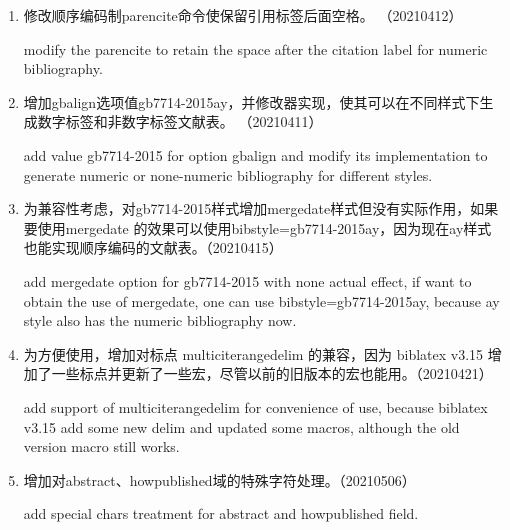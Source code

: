 \label{up:20210506}

\begin{enumerate}
\item 修改顺序编码制parencite命令使保留引用标签后面空格。 （20210412）

modify the parencite to retain the space after the citation label for numeric bibliography.


\item 增加gbalign选项值gb7714-2015ay，并修改器实现，使其可以在不同样式下生成数字标签和非数字标签文献表。 （20210411）

add value gb7714-2015 for option gbalign and modify its implementation to generate numeric or none-numeric bibliography for different styles.

\item 为兼容性考虑，对gb7714-2015样式增加mergedate样式但没有实际作用，如果要使用mergedate 的效果可以使用bibstyle=gb7714-2015ay，因为现在ay样式也能实现顺序编码的文献表。（20210415）

add mergedate option for gb7714-2015 with none actual effect, if want to obtain the use of mergedate, one can use bibstyle=gb7714-2015ay, because ay style also has the numeric bibliography now.

\item 为方便使用，增加对标点 multiciterangedelim 的兼容，因为 biblatex v3.15 增加了一些标点并更新了一些宏，尽管以前的旧版本的宏也能用。（20210421）

add support of multiciterangedelim for convenience of use, because biblatex v3.15 add some new delim and updated some macros, although the old version macro still works.

\item 增加对abstract、howpublished域的特殊字符处理。（20210506）

add special chars treatment for abstract and howpublished field.

\end{enumerate}

\label{up:20210403}

